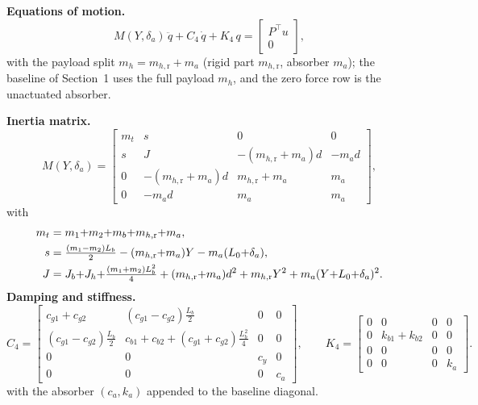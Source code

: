 \documentclass[11pt]{article}
\newcommand{\mhr}{m_{h,\mathrm{r}}}
\begin{document}
\medskip\noindent\textbf{Equations of motion.}
\begin{equation}
  M(Y,\delta_a)\,\ddot q + C_4\,\dot q + K_4\,q = \begin{bmatrix} P^\top u \\ 0 \end{bmatrix} ,
  \label{eq:sys-eom}
\end{equation}
with the payload split $m_h = \mhr + m_a$ (rigid part $\mhr$, absorber $m_a$); the baseline of
Section~1 uses the full payload $m_h$, and the zero force row is the unactuated absorber.

\medskip\noindent\textbf{Inertia matrix.}
\begin{equation}
  M(Y,\delta_a) =
  \begin{bmatrix}
    m_t   & s                  & 0            & 0 \\[2mm]
    s     & J                  & -(\mhr{+}m_a)d & -m_a d \\[2mm]
    0     & -(\mhr{+}m_a)d     & \mhr{+}m_a    & m_a \\[2mm]
    0     & -m_a d             & m_a          & m_a
  \end{bmatrix},
  \label{eq:sys-M}
\end{equation}
with
\begin{align}
  m_t &= m_1{+}m_2{+}m_b{+}\mhr{+}m_a , \notag\\
  s   &= \tfrac{(m_1-m_2)L_b}{2} - (\mhr{+}m_a)Y - m_a(L_0{+}\delta_a) , \label{eq:sys-consts}\\
  J   &= J_b{+}J_h{+}\tfrac{(m_1+m_2)L_b^2}{4} + (\mhr{+}m_a)d^2 + \mhr Y^2 + m_a(Y{+}L_0{+}\delta_a)^2 . \notag
\end{align}
\medskip\noindent\textbf{Damping and stiffness.}
\begin{equation}
  C_4 =
  \begin{bmatrix}
    c_{g1}{+}c_{g2}             & (c_{g1}{-}c_{g2})\tfrac{L_b}{2}                    & 0   & 0 \\[2mm]
    (c_{g1}{-}c_{g2})\tfrac{L_b}{2} & c_{b1}{+}c_{b2}{+}(c_{g1}{+}c_{g2})\tfrac{L_b^2}{4} & 0   & 0 \\[2mm]
    0                          & 0                                                  & c_y & 0 \\[2mm]
    0                          & 0                                                  & 0   & c_a
  \end{bmatrix},
  \qquad
  K_4 =
  \begin{bmatrix}
    0 & 0            & 0 & 0 \\[2mm]
    0 & k_{b1}{+}k_{b2} & 0 & 0 \\[2mm]
    0 & 0            & 0 & 0 \\[2mm]
    0 & 0            & 0 & k_a
  \end{bmatrix}.
  \label{eq:sys-CK}
\end{equation}
with the absorber $(c_a,k_a)$ appended to the baseline diagonal.
\end{document}
